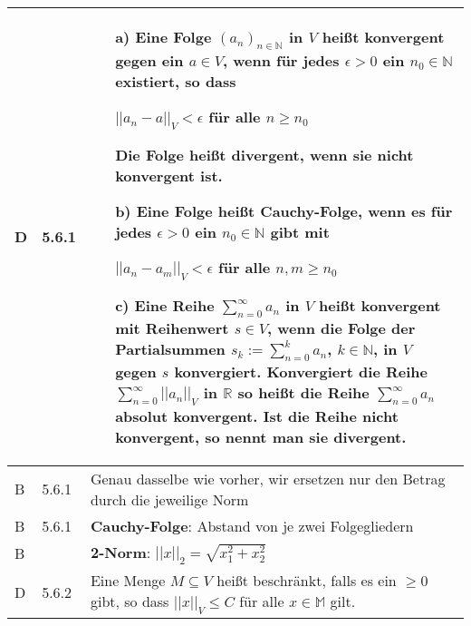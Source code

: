     \begin{longtable}{p{0.75cm} p{1cm} p{16cm}}
        \toprule

        D   & 5.6.1 &   \begin{itemize}[topsep=-0.5cm]
                            \item[a)] Eine Folge $(a_n)_{n \in \mathbb{N}}$ in $V$ heißt \textbf{konvergent} gegen ein $a \in V$, wenn
                                        für jedes $\epsilon > 0$ ein $n_0 \in \mathbb{N}$ existiert, so dass \hfill \break
                                        \centerline{$||a_n - a||_V < \epsilon$ für alle $n \geq n_0$}
                                        Die Folge heißt \textbf{divergent,} wenn sie nicht konvergent ist.
                            \item[b)] Eine Folge heißt \textbf{Cauchy-Folge}, wenn es für jedes $\epsilon > 0$ ein $n_0 \in \mathbb{N}$ gibt
                                        mit \hfill \break
                                        \centerline{$||a_n - a_m||_V < \epsilon$ für alle $n,m \geq n_0$}
                            \item[c)] Eine Reihe $\sum^{\infty}_{n=0} a_n$ in $V$ heißt \textbf{konvergent} mit Reihenwert $s \in V$, wenn die
                                        Folge der Partialsummen $s_k := \sum^{k}_{n=0} a_n$, $k \in \mathbb{N}$, in $V$ gegen $s$ konvergiert. \hfill \break
                                        Konvergiert die Reihe $\sum^{\infty}_{n=0} ||a_n||_V$ in $\mathbb{R}$ so heißt die Reihe
                                        $\sum^{\infty}_{n=0}a_n$ \textbf{absolut konvergent}. \hfill \break
                                        Ist die Reihe nicht konvergent, so nennt man sie \textbf{divergent}.
                        \end{itemize} \vspace{-0cm} \\
        \midrule
        B   & 5.6.1 &   Genau dasselbe wie vorher, wir ersetzen nur den Betrag durch die jeweilige Norm \\
        \midrule
        B   & 5.6.1 &   \textbf{Cauchy-Folge}: Abstand von je zwei Folgegliedern \\
        \midrule
        B   &       &   \textbf{2-Norm}: $||x||_2 = \sqrt{x_1^2 + x_2^2}$ \\
        \midrule
        D   & 5.6.2 &   Eine Menge $M \subseteq V$ hei\ss t beschränkt, falls es ein $ \geq 0$ gibt, so dass $||x||_V \leq C$ für alle 
                        $x \in \mathbb{M}$ gilt. \\

\end{longtable}
